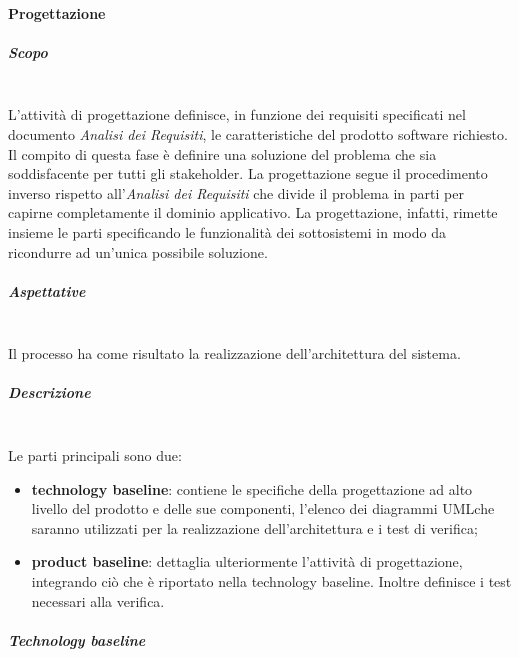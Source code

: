 		\paragraph{Progettazione} 
			\subparagraph*{Scopo} \mbox{}\\
			
			\noindent L'attività di progettazione definisce, in funzione dei requisiti specificati 
			nel documento \textit{Analisi dei Requisiti}, le caratteristiche del prodotto 
			software richiesto. Il compito di questa fase è definire una soluzione del 
			problema che sia soddisfacente per tutti gli stakeholder. La progettazione segue 
			il procedimento inverso rispetto all'\textit{Analisi dei Requisiti} che divide 
			il problema in parti per capirne completamente il dominio applicativo. La 
			progettazione, infatti, rimette insieme le parti specificando le funzionalità 
			dei sottosistemi in modo da ricondurre ad un'unica possibile soluzione. \newline 
			
			
			\subparagraph*{Aspettative} \mbox{}\\
			\noindent Il processo ha come risultato la realizzazione dell'architettura del sistema. 
			\newline
			
			\subparagraph*{Descrizione}  \mbox{}\\
			\noindent Le parti principali sono due:
				\begin{itemize}
					\item \textbf{technology baseline}: contiene le specifiche della 
						progettazione ad alto livello del prodotto e delle sue componenti, l'elenco dei 
						diagrammi UML\glosp che saranno utilizzati per la realizzazione 
						dell'architettura e i test di verifica;
					\item \textbf{product baseline}: dettaglia ulteriormente l'attività di 
						progettazione, integrando ciò che è riportato nella technology baseline. Inoltre 
						definisce i test necessari alla verifica. \newline
				\end{itemize}
			
			
			\subparagraph*{Technology baseline} \mbox{}\\
				
